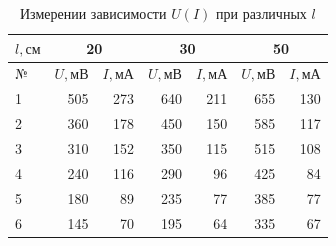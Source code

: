 \documentclass[a4paper,12pt]{article}
\begin{document}
    \begin{table}[H]
        \begin{center}

        \begin{tabular}{|l|r|r|r|r|r|r|}
        \hline
        $l, см$ & \multicolumn{2}{c|}{20} & \multicolumn{2}{c|}{30} & \multicolumn{2}{c|}{50} \\
        \hline
        {№} &      $U, мВ$ &        $I, мА$&      $U, мВ$ &         $I, мА$ &    $U, мВ$ &         $I, мА$ \\
        \hline \rowcolor{Gray}
        1  &  505 & 273 & 640 & 211 &  655 & 130 \\
        2  &  360 & 178 & 450 & 150 &  585 & 117 \\\rowcolor{Gray}
        3  &  310 & 152 & 350 & 115 &  515 & 108 \\
        4  &  240 & 116 & 290 &  96 &  425 &  84 \\\rowcolor{Gray}
        5  &  180 &  89 & 235 &  77 &  385 &  77 \\
        6  &  145 &  70 & 195 &  64 &  335 &  67 \\

        \hline
        \end{tabular}
            \caption{Измерении зависимости $U(I)$ при различных $l$}
        \end{center}

    \end{table}

    \paragraph{}
\end{document}
